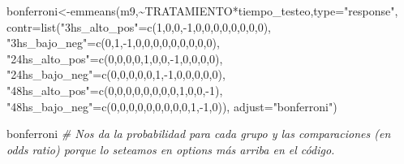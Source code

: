 \documentclass[
]{article}
\newenvironment{Shaded}{\begin{snugshade}}{\end{snugshade}}
\newcommand{\AttributeTok}[1]{\textcolor[rgb]{0.77,0.63,0.00}{#1}}
\newcommand{\CommentTok}[1]{\textcolor[rgb]{0.56,0.35,0.01}{\textit{#1}}}
\newcommand{\DecValTok}[1]{\textcolor[rgb]{0.00,0.00,0.81}{#1}}
\newcommand{\FunctionTok}[1]{\textcolor[rgb]{0.00,0.00,0.00}{#1}}
\newcommand{\NormalTok}[1]{#1}
\newcommand{\OtherTok}[1]{\textcolor[rgb]{0.56,0.35,0.01}{#1}}
\newcommand{\SpecialCharTok}[1]{\textcolor[rgb]{0.00,0.00,0.00}{#1}}
\newcommand{\StringTok}[1]{\textcolor[rgb]{0.31,0.60,0.02}{#1}}
\begin{document}
\begin{Shaded}
\begin{Highlighting}[]
\NormalTok{bonferroni}\OtherTok{\textless{}{-}}\FunctionTok{emmeans}\NormalTok{(m9,}\SpecialCharTok{\textasciitilde{}}\NormalTok{TRATAMIENTO}\SpecialCharTok{*}\NormalTok{tiempo\_testeo,}\AttributeTok{type=}\StringTok{"response"}\NormalTok{,}
                \AttributeTok{contr=}\FunctionTok{list}\NormalTok{(}\StringTok{"3hs\_alto\_pos"}\OtherTok{=}\FunctionTok{c}\NormalTok{(}\DecValTok{1}\NormalTok{,}\DecValTok{0}\NormalTok{,}\DecValTok{0}\NormalTok{,}\SpecialCharTok{{-}}\DecValTok{1}\NormalTok{,}\DecValTok{0}\NormalTok{,}\DecValTok{0}\NormalTok{,}\DecValTok{0}\NormalTok{,}\DecValTok{0}\NormalTok{,}\DecValTok{0}\NormalTok{,}\DecValTok{0}\NormalTok{,}\DecValTok{0}\NormalTok{,}\DecValTok{0}\NormalTok{), }
                     \StringTok{"3hs\_bajo\_neg"}\OtherTok{=}\FunctionTok{c}\NormalTok{(}\DecValTok{0}\NormalTok{,}\DecValTok{1}\NormalTok{,}\SpecialCharTok{{-}}\DecValTok{1}\NormalTok{,}\DecValTok{0}\NormalTok{,}\DecValTok{0}\NormalTok{,}\DecValTok{0}\NormalTok{,}\DecValTok{0}\NormalTok{,}\DecValTok{0}\NormalTok{,}\DecValTok{0}\NormalTok{,}\DecValTok{0}\NormalTok{,}\DecValTok{0}\NormalTok{,}\DecValTok{0}\NormalTok{), }
                     \StringTok{"24hs\_alto\_pos"}\OtherTok{=}\FunctionTok{c}\NormalTok{(}\DecValTok{0}\NormalTok{,}\DecValTok{0}\NormalTok{,}\DecValTok{0}\NormalTok{,}\DecValTok{0}\NormalTok{,}\DecValTok{1}\NormalTok{,}\DecValTok{0}\NormalTok{,}\DecValTok{0}\NormalTok{,}\SpecialCharTok{{-}}\DecValTok{1}\NormalTok{,}\DecValTok{0}\NormalTok{,}\DecValTok{0}\NormalTok{,}\DecValTok{0}\NormalTok{,}\DecValTok{0}\NormalTok{), }
                     \StringTok{"24hs\_bajo\_neg"}\OtherTok{=}\FunctionTok{c}\NormalTok{(}\DecValTok{0}\NormalTok{,}\DecValTok{0}\NormalTok{,}\DecValTok{0}\NormalTok{,}\DecValTok{0}\NormalTok{,}\DecValTok{0}\NormalTok{,}\DecValTok{1}\NormalTok{,}\SpecialCharTok{{-}}\DecValTok{1}\NormalTok{,}\DecValTok{0}\NormalTok{,}\DecValTok{0}\NormalTok{,}\DecValTok{0}\NormalTok{,}\DecValTok{0}\NormalTok{,}\DecValTok{0}\NormalTok{), }
                     \StringTok{"48hs\_alto\_pos"}\OtherTok{=}\FunctionTok{c}\NormalTok{(}\DecValTok{0}\NormalTok{,}\DecValTok{0}\NormalTok{,}\DecValTok{0}\NormalTok{,}\DecValTok{0}\NormalTok{,}\DecValTok{0}\NormalTok{,}\DecValTok{0}\NormalTok{,}\DecValTok{0}\NormalTok{,}\DecValTok{0}\NormalTok{,}\DecValTok{1}\NormalTok{,}\DecValTok{0}\NormalTok{,}\DecValTok{0}\NormalTok{,}\SpecialCharTok{{-}}\DecValTok{1}\NormalTok{), }
                     \StringTok{"48hs\_bajo\_neg"}\OtherTok{=}\FunctionTok{c}\NormalTok{(}\DecValTok{0}\NormalTok{,}\DecValTok{0}\NormalTok{,}\DecValTok{0}\NormalTok{,}\DecValTok{0}\NormalTok{,}\DecValTok{0}\NormalTok{,}\DecValTok{0}\NormalTok{,}\DecValTok{0}\NormalTok{,}\DecValTok{0}\NormalTok{,}\DecValTok{0}\NormalTok{,}\DecValTok{1}\NormalTok{,}\SpecialCharTok{{-}}\DecValTok{1}\NormalTok{,}\DecValTok{0}\NormalTok{)),}
                \AttributeTok{adjust=}\StringTok{"bonferroni"}\NormalTok{)}

\NormalTok{bonferroni }\CommentTok{\# Nos da la probabilidad para cada grupo y las comparaciones (en odds ratio) porque lo seteamos en options más arriba en el código.}
\end{Highlighting}
\end{Shaded}
\end{document}
